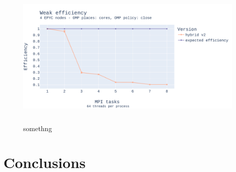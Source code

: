 \documentclass{report}
\begin{document}
\begin{figure}[H]
\centering
\includegraphics[width=14cm, height=7cm]{./images/weak_MPI_epyc_hybrid.pdf}
\caption{\label{fig:weakmpiepychybrid} somethng}
\end{figure}

\section{Conclusions}

\printbibliography
\end{document}
